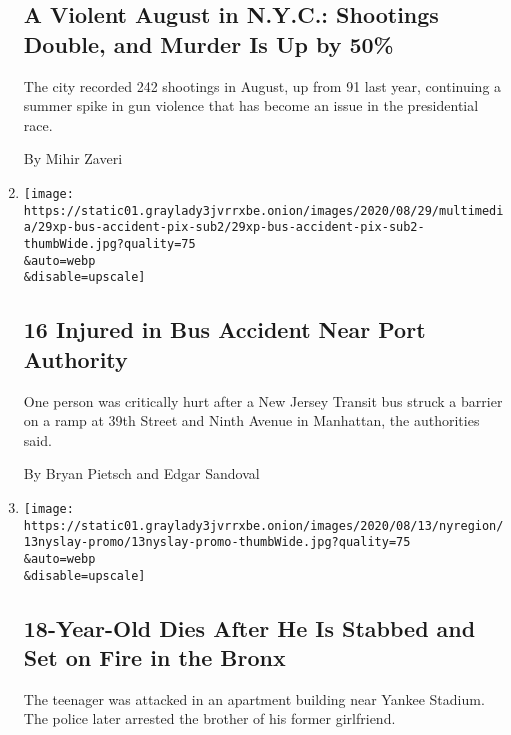 \begin{enumerate}
  \hypertarget{a-violent-august-in-nyc-shootings-double-and-murder-is-up-by-50}{%
  \subsection{A Violent August in N.Y.C.: Shootings Double, and Murder
  Is Up by
  50\%}\label{a-violent-august-in-nyc-shootings-double-and-murder-is-up-by-50}}

  The city recorded 242 shootings in August, up from 91 last year,
  continuing a summer spike in gun violence that has become an issue in
  the presidential race.

  By Mihir Zaveri
\item
  \href{/2020/08/29/nyregion/bus-accident-nyc-port-authority.html}{}

  \texttt{[image: https://static01.graylady3jvrrxbe.onion/images/2020/08/29/multimedia/29xp-bus-accident-pix-sub2/29xp-bus-accident-pix-sub2-thumbWide.jpg?quality=75\\\&auto=webp\\\&disable=upscale]}

  \hypertarget{16-injured-in-bus-accident-near-port-authority}{%
  \subsection{16 Injured in Bus Accident Near Port
  Authority}\label{16-injured-in-bus-accident-near-port-authority}}

  One person was critically hurt after a New Jersey Transit bus struck a
  barrier on a ramp at 39th Street and Ninth Avenue in Manhattan, the
  authorities said.

  By Bryan Pietsch and Edgar Sandoval
\item
  \href{/2020/08/13/nyregion/bronx-teen-stabbed-fire-winston-ortiz.html}{}

  \texttt{[image: https://static01.graylady3jvrrxbe.onion/images/2020/08/13/nyregion/13nyslay-promo/13nyslay-promo-thumbWide.jpg?quality=75\\\&auto=webp\\\&disable=upscale]}

  \hypertarget{18-year-old-dies-after-he-is-stabbed-and-set-on-fire-in-the-bronx}{%
  \subsection{18-Year-Old Dies After He Is Stabbed and Set on Fire in
  the
  Bronx}\label{18-year-old-dies-after-he-is-stabbed-and-set-on-fire-in-the-bronx}}

  The teenager was attacked in an apartment building near Yankee
  Stadium. The police later arrested the brother of his former
  girlfriend.


\end{enumerate}
